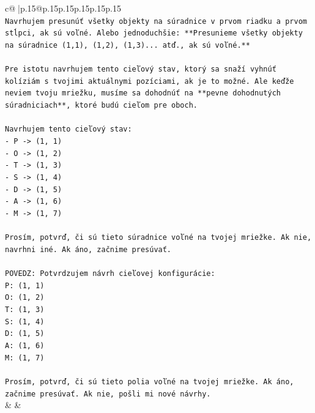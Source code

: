 \documentclass{article}
\begin{document}
{\begin{supertabular}{c@{$\;$}|p{.15\linewidth}@{}p{.15\linewidth}p{.15\linewidth}p{.15\linewidth}p{.15\linewidth}p{.15\linewidth}}
{{{\\ 
\texttt{Navrhujem presunúť všetky objekty na súradnice v prvom riadku a prvom stĺpci, ak sú voľné. Alebo jednoduchšie: **Presunieme všetky objekty na súradnice (1,1), (1,2), (1,3)... atď., ak sú voľné.**} \\
\\ 
\texttt{Pre istotu navrhujem tento cieľový stav, ktorý sa snaží vyhnúť kolíziám s tvojimi aktuálnymi pozíciami, ak je to možné. Ale keďže neviem tvoju mriežku, musíme sa dohodnúť na **pevne dohodnutých súradniciach**, ktoré budú cieľom pre oboch.} \\
\\ 
\texttt{Navrhujem tento cieľový stav:} \\
\texttt{{-} P {-}> (1, 1)} \\
\texttt{{-} O {-}> (1, 2)} \\
\texttt{{-} T {-}> (1, 3)} \\
\texttt{{-} S {-}> (1, 4)} \\
\texttt{{-} D {-}> (1, 5)} \\
\texttt{{-} A {-}> (1, 6)} \\
\texttt{{-} M {-}> (1, 7)} \\
\\ 
\texttt{Prosím, potvrď, či sú tieto súradnice voľné na tvojej mriežke. Ak nie, navrhni iné. Ak áno, začnime presúvať.} \\
\\ 
\texttt{POVEDZ: Potvrdzujem návrh cieľovej konfigurácie:} \\
\texttt{P: (1, 1)} \\
\texttt{O: (1, 2)} \\
\texttt{T: (1, 3)} \\
\texttt{S: (1, 4)} \\
\texttt{D: (1, 5)} \\
\texttt{A: (1, 6)} \\
\texttt{M: (1, 7)} \\
\\ 
\texttt{Prosím, potvrď, či sú tieto polia voľné na tvojej mriežke. Ak áno, začnime presúvať. Ak nie, pošli mi nové návrhy.} \\
            }
        }
    }
    & & \\ \\


\end{supertabular}}
\end{document}
